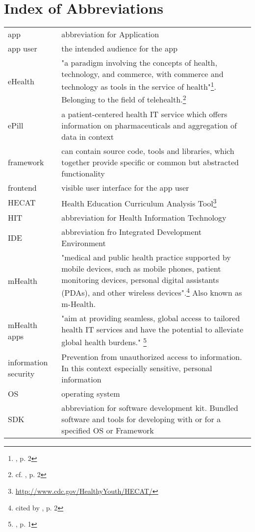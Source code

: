 \section*{Index of Abbreviations}
\begin{longtable}{@{}p{}@{}p{}@{}}
    app & abbreviation for Application\\
    app user & the intended audience for the app\\
    eHealth & "a paradigm involving the concepts of health, technology, and commerce, with commerce and technology as tools in the service of health"\footnote{\cite{MartinezPerez.2013}, p. 2}. Belonging to the field of telehealth.\footnote{cf. \cite{MartinezPerez.2013}, p. 2}\\
    ePill & a patient-centered health IT service which offers information on pharmaceuticals and aggregation of data in context\\
    framework & can contain source code, tools and libraries, which together provide specific or common but abstracted functionality\\
    frontend & visible user interface for the app user\\
    HECAT & Health Education Curriculum Analysis Tool\footnote{\url{http://www.cdc.gov/HealthyYouth/HECAT/}}\\
    HIT & abbreviation for Health Information Technology\\
    IDE & abbreviation fro Integrated Development Environment\\
    mHealth & "medical and public health practice supported by mobile devices, such as mobile phones, patient monitoring devices, personal digital assistants (PDAs), and other wireless devices".\footnote{\cite{WorldHealthOrganization.2011} cited by \cite{MartinezPerez.2013}, p. 2} Also known as m-Health.\\
    mHealth apps & "aim at providing seamless, global access to tailored health IT services and have the potential to alleviate global health burdens." \footnote{\cite{Dehling.2013}, p. 1}\\
    information security & Prevention from unauthorized access to information. In this context especially sensitive, personal information\\
    OS & operating system\\
    SDK & abbreviation for software development kit. Bundled software and tools for developing with or for a specified OS or Framework\\

\end{longtable}

